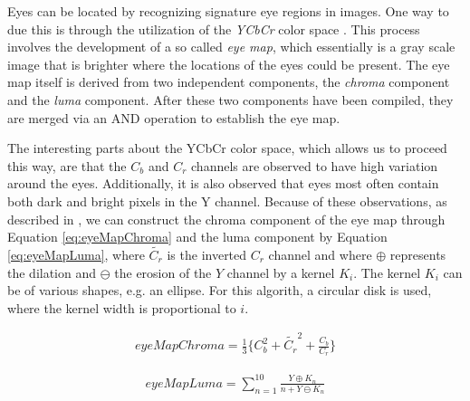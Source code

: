 Eyes can be located by recognizing signature eye regions in images. One way to due this is through the utilization of the \textit{YCbCr} color space \cite{fdInColorImages}. This process involves the development of a so called \textit{eye map}, which essentially is a gray scale image that is brighter where the locations of the eyes could be present. The eye map itself is derived from two independent components, the \textit{chroma} component and the \textit{luma} component. After these two components have been compiled, they are merged via an AND operation to establish the eye map. 

The interesting parts about the YCbCr color space, which allows us to proceed this way, are that the $C_{b}$ and $C_{r}$ channels are observed to have high variation around the eyes. Additionally, it is also observed that eyes most often contain both dark and bright pixels in the Y channel. Because of these observations, as described in \cite{fdInColorImages}, we can construct  the chroma component of the eye map through Equation \ref{eq:eyeMapChroma} and the luma component by Equation \ref{eq:eyeMapLuma}, where $\tilde{C_r}$ is the inverted $C_r$ channel and where $\oplus$ represents the dilation and $\ominus$ the erosion of the $Y$ channel by a kernel $K_{i}$. The kernel $K_{i}$ can be of various shapes, e.g. an ellipse. For this algorith, a circular disk is used, where the kernel width is proportional to $i$.

\begin{equation} \label{eq:eyeMapChroma}
\begin{split}
eyeMapChroma = \frac{1}{3} \lbrace C_b^2 + \tilde{C_r}^2 + \frac{C_b}{C_r} \rbrace
\end{split}
\end{equation}


\begin{equation} \label{eq:eyeMapLuma}
\begin{split}
  eyeMapLuma = \sum_{n=1}^{10}\frac{Y\oplus K_{n}}{n + Y\ominus  K_{n}}
\end{split}
\end{equation}








